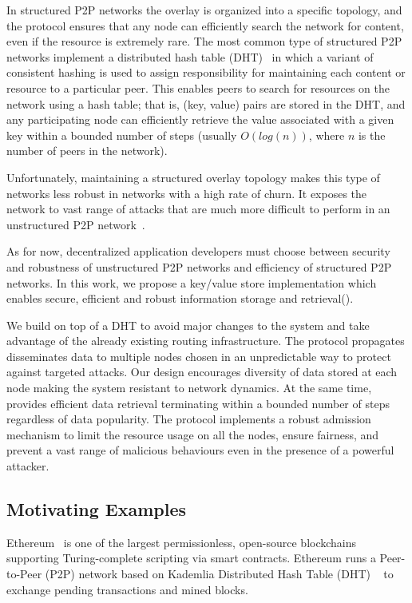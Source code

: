 In structured P2P networks the overlay is organized into a specific topology, and the protocol ensures that any node can efficiently search the network for content, even if the resource is extremely rare. The most common type of structured P2P networks implement a distributed hash table (DHT)~\cite{kademlia, chord, pastry, can, tapestry} in which a variant of consistent hashing is used to assign responsibility for maintaining each content or resource to a particular peer. This enables peers to search for resources on the network using a hash table; that is, (key, value) pairs are stored in the DHT, and any participating node can efficiently retrieve the value associated with a given key within a bounded number of steps (usually $O(log(n))$, where $n$ is the number of peers in the network).

Unfortunately, maintaining a structured overlay topology makes this type of networks less robust in networks with a high rate of churn. It exposes the network to vast range of attacks that are much more difficult to perform in an unstructured P2P network~\cite{Trifa2012TaxonomyOS}.

As for now, decentralized application developers must choose between security and robustness of unstructured P2P networks and efficiency of structured P2P networks. In this work, we propose a key/value store implementation which enables secure,  efficient and robust  information storage and retrieval(\textit{\sysname}).

We build \sysname on top of a DHT to avoid major changes to the system and take advantage of the already existing routing infrastructure. The protocol propagates disseminates data to multiple nodes chosen in an unpredictable way to protect against targeted attacks. Our design encourages diversity of data stored at each node making the system resistant to network dynamics. At the same time, \sysname provides efficient data retrieval terminating within a bounded number of steps  regardless of data popularity. The protocol implements a robust admission mechanism to limit the resource usage on all the nodes, ensure fairness, and prevent a vast range of malicious behaviours even in the presence of a powerful attacker.

\subsection{Motivating Examples}
 Ethereum~\cite{buterin2013ethereum}  is one of the largest permissionless,  open-source  blockchains supporting Turing-complete scripting via smart contracts. Ethereum runs a Peer-to-Peer (P2P) network based on Kademlia Distributed Hash Table (DHT) ~\cite{maymounkov2002kademlia} to exchange pending transactions and mined blocks. 

